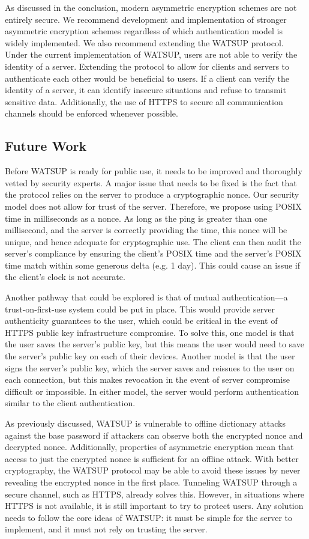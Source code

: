 As discussed in the conclusion, modern asymmetric encryption schemes are not entirely secure. We recommend development and implementation of stronger asymmetric encryption schemes regardless of which authentication model is widely implemented. We also recommend extending the WATSUP protocol. Under the current implementation of WATSUP, users are not able to verify the identity of a server. Extending the protocol to allow for clients and servers to authenticate each other would be beneficial to users. If a client can verify the identity of a server, it can identify insecure situations and refuse to transmit sensitive data. Additionally, the use of HTTPS to secure all communication channels should be enforced whenever possible.

\subsection{Future Work}

Before WATSUP is ready for public use, it needs to be improved and thoroughly vetted by security experts. A major issue that needs to be fixed is the fact that the protocol relies on the server to produce a cryptographic nonce. Our security model does not allow for trust of the server. Therefore, we propose using POSIX time in milliseconds as a nonce. As long as the ping is greater than one millisecond, and the server is correctly providing the time, this nonce will be unique, and hence adequate for cryptographic use. The client can then audit the server's compliance by ensuring the client's POSIX time and the server's POSIX time match within some generous delta (e.g. 1 day). This could cause an issue if the client's clock is not accurate.

Another pathway that could be explored is that of mutual authentication---a trust-on-first-use system could be put in place. This would provide server authenticity guarantees to the user, which could be critical in the event of HTTPS public key infrastructure compromise. To solve this, one model is that the user saves the server's public key, but this means the user would need to save the server's public key on each of their devices. Another model is that the user signs the server's public key, which the server saves and reissues to the user on each connection, but this makes revocation in the event of server compromise difficult or impossible. In either model, the server would perform authentication similar to the client authentication.

As previously discussed, WATSUP is vulnerable to offline dictionary attacks against the base password if attackers can observe both the encrypted nonce and decrypted nonce. Additionally, properties of asymmetric encryption mean that access to just the encrypted nonce is sufficient for an offline attack. With better cryptography, the WATSUP protocol may be able to avoid these issues by never revealing the encrypted nonce in the first place. Tunneling WATSUP through a secure channel, such as HTTPS, already solves this. However, in situations where HTTPS is not available, it is still important to try to protect users. Any solution needs to follow the core ideas of WATSUP: it must be simple for the server to implement, and it must not rely on trusting the server.

